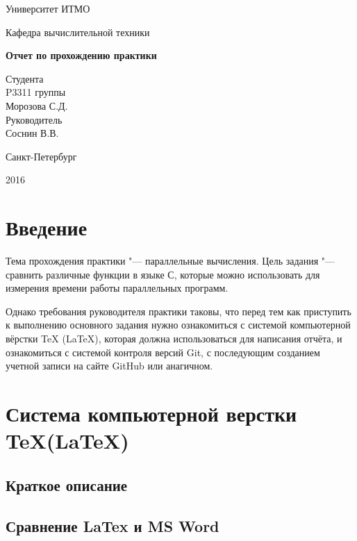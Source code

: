 \documentclass{article}
\begin{document}
\begin{titlepage}
	\centering
	{\LARGE Университет ИТМО \par}
	\vspace{5mm}
	{\Large Кафедра вычислительной техники\par}
	\vspace{1.5cm}
	{\huge\bfseries Отчет по прохождению практики\par}
	\vspace{3cm}
	\begin{flushleft}
		\hangindent=10cm
		\noindent 
		{\Large Студента\\
				P3311 группы \\
				Морозова С.Д.\\
				Руководитель \\
				Соснин В.В.
		}
	\end{flushleft}
	\vfill
	\vspace{1cm}
	{\large Санкт-Петербург \par}
	{\large 2016  \par}
\end{titlepage}
	\setcounter{tocdepth}{3}	
	\tableofcontents
	\newpage
	\section{Введение}
	\indent 	
	Тема прохождения практики "--- параллельные вычисления. Цель задания "--- сравнить различные функции в языке С, которые можно использовать для измерения времени работы параллельных программ.
	
	
	Однако требования руководителя практики таковы, что перед тем как приступить к выполнению основного задания нужно ознакомиться с системой компьютерной вёрстки TeX (LaTeX), которая должна
использоваться для написания отчёта, и ознакомиться с системой контроля версий Git, с последующим созданием учетной записи на сайте GitHub или анагичном.
	\newpage
	\section{Система компьютерной верстки TeX(LaTeX)}	
		\subsection{Краткое описание}
		\subsection{Сравнение LaTex и MS Word}
\end{document}
